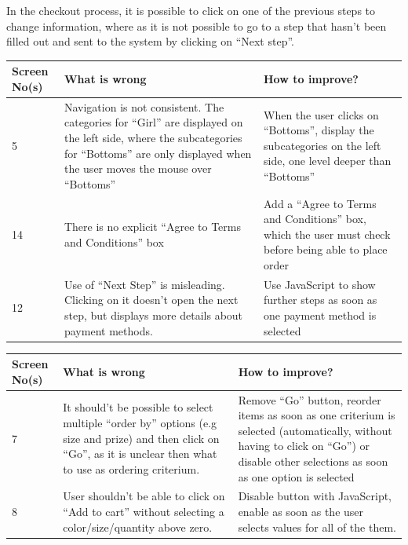 In the checkout process, it is possible to click on one of the previous steps to change information, where as it is not possible to go to a step that hasn't been filled out and sent to the system by clicking on ``Next step''.

\begin{table}[htdp]
\begin{center}
\begin{tabular}{|p{2cm}|p{6.5cm}|p{6.5cm}|}
\hline
\textbf{Screen No(s)} & \textbf{What is wrong} & \textbf{How to improve?} \\
\hline
5 & Navigation is not consistent. The categories for ``Girl'' are displayed on the left side, where the subcategories for ``Bottoms'' are only displayed when the user moves the mouse over ``Bottoms'' & When the user clicks on ``Bottoms'', display the subcategories on the left side, one level deeper than ``Bottoms'' \\ 
\hline
14 & There is no explicit ``Agree to Terms and Conditions'' box & Add a ``Agree to Terms and Conditions'' box, which the user must check before being able to place order\\
\hline
12 & Use of ``Next Step'' is misleading. Clicking on it doesn't open the next step, but displays more details about payment methods. & Use JavaScript to show further steps as soon as one payment method is selected \\
\hline
\end{tabular}
\end{center}
\label{4_heurisitcs_eval}
\end{table}


\begin{table}[htdp]
\begin{center}
\begin{tabular}{|p{2cm}|p{6.5cm}|p{6.5cm}|}
\hline
\textbf{Screen No(s)} & \textbf{What is wrong} & \textbf{How to improve?} \\
\hline
7 & It should't be possible to select multiple ``order by'' options (e.g size and prize) and then click on ``Go'', as it is unclear then what to use as ordering criterium. & Remove ``Go'' button, reorder items as soon as one criterium is selected (automatically, without having to click on ``Go'') or disable other selections as soon as one option is selected\\ 
\hline
8 & User shouldn't be able to click on ``Add to cart'' without selecting a color/size/quantity above zero. & Disable button with JavaScript, enable as soon as the user selects values for all of the them.\\
\hline
\end{tabular}
\end{center}
\label{5_heurisitcs_eval}
\end{table}


